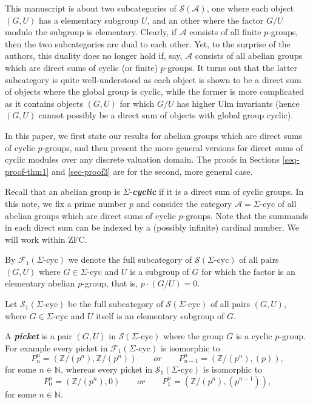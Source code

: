 \documentclass[twoside,leqno,12pt]{amsart}
\def\boldit#1{\textit{\textbf{#1}}}
\def\boldit#1{\textit{\textbf{#1}}}
\def\SigCyc{\mbox{$\Sigma$-cyc}}
\theoremstyle{definition}
\theoremstyle{remark}
\numberwithin{equation}{section}
\begin{document}
  This manuscript is about two subcategories of $\mathcal S(\mathcal A)$, one where each object $(G,U)$
  has a elementary subgroup $U$, and an other where the factor $G/U$ modulo the subgroup is elementary.
  Clearly, if $\mathcal A$ consists of all finite $p$-groups, then the two subcategories are dual to each other.
  Yet, to the surprise of the authors, this duality does no longer hold if, say, $\mathcal A$ consists of all
  abelian groups which are direct sums of cyclic (or finite) $p$-groups.
  It turns out that the latter subcategory is quite well-understood as each object is shown to be a direct sum
  of objects where the global group is cyclic,
  while the former is more complicated as it contains objects $(G,U)$ for which $G/U$ has
  higher Ulm invariants (hence $(G,U)$ cannot possibly be a direct sum of objects with global group cyclic).

  \medskip
    In this paper, we first state our results for abelian groups
    which are direct sums of cyclic $p$-groups, and then present the more general
    versions   for direct sums of cyclic modules over any discrete valuation domain.
    The proofs in Sections \ref{seq-proof-thm1} and \ref{sec-proof3} are for the
    second, more general case.

  \medskip
Recall that an abelian group is $\Sigma$-\boldit{cyclic} if it is a direct sum of cyclic groups.
In this note, we fix a prime number $p$ and consider the category $\mathcal A=\SigCyc$
of all abelian groups which are direct sums of cyclic $p$-groups.
  Note that the summands in each direct sum can be indexed by a
  (possibly infinite) cardinal number.  We will work within ZFC.


By $\mathcal F_1(\SigCyc)$ we denote the full subcategory of $\mathcal S(\SigCyc)$
of all pairs $(G,U)$ where $G\in\SigCyc$ and $U$ is a subgroup of $G$
for which the factor is an elementary abelian $p$-group,
  that is, $p\cdot(G/U)=0$.


Let $\mathcal{S}_1(\SigCyc)$ be the full subcategory of $\mathcal{S}(\SigCyc)$ of all pairs $(G,U)$,
where $G\in\SigCyc$ and $U$ itself is an elementary subgroup of $G$.


A \boldit{picket} is a pair $(G,U)$ in $\mathcal{S}(\SigCyc)$ where the group $G$ is a cyclic $p$-group. For example every picket in $\mathcal F_1(\SigCyc)$ is isomorphic to
$$P^n_n=(\mathbb Z/(p^n),\mathbb Z/(p^n))\qquad or \qquad P^n_{n-1}=(\mathbb Z/(p^n),(p)),$$
for some $n\in\mathbb N$, whereas every picket in $\mathcal{S}_1(\SigCyc)$ is  isomorphic to
$$P_0^n=(\mathbb Z/(p^n),0)\qquad or \qquad P^n_{1}=(\mathbb Z/(p^n),(p^{n-1})),$$
for some $n\in \mathbb N$.
\end{document}
